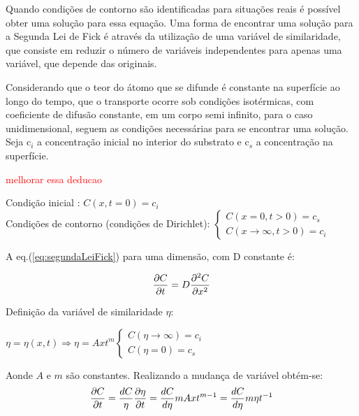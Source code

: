 \documentclass[]{politex}
\newcommand\myworries[1]{\textcolor{red}{#1}}
\begin{document}
	Quando condições de contorno são identificadas para situações reais é possível obter uma solução para essa equação. Uma forma de encontrar uma solução para a Segunda Lei de Fick é através da utilização de uma variável de similaridade, que consiste em reduzir o número de variáveis independentes para apenas uma variável, que depende das originais. \par
	Considerando que o teor do átomo que se difunde é constante na superfície ao longo do tempo, que o transporte ocorre sob condições isotérmicas, com coeficiente de difusão constante, em um corpo semi infinito, para o caso unidimensional, seguem as condições necessárias para se encontrar uma solução. Seja c$_i$ a concentração inicial no interior do substrato e c$_s$ a concentração na superfície.\par
\myworries{melhorar essa deducao}
\begin{center} 
	Condição inicial : $C(x,t=0) = c_i$ \\
	Condições de contorno (condições de Dirichlet): 
	\begin{math}
  		\left\{
    	\begin{array}{l}
      		C(x=0,t>0) = c_s\\
      		C(x\rightarrow \infty, t>0) = c_i
    	\end{array}
  		\right.
	\end{math}
\end{center}

A eq.(\ref{eq:segundaLeiFick}) para uma dimensão, com D constante é:

\begin{equation} \label{eq:segundaLeiFickUmD}
 \pdv{C}{t} = D\pdv[2]{C}{x}
\end{equation}

Definição da variável de similaridade $\eta$:

\begin{center}
	\begin{math}
		\eta = \eta(x,t) \Rightarrow \eta = Axt^m
		\left\{
    		\begin{array}{l}
      			C(\eta\rightarrow \infty) = c_i\\
      			C(\eta=0) = c_s
    		\end{array}
		\right.
	\end{math}
\end{center}

Aonde $A$ e $m$ são constantes.
Realizando a mudança de variável obtém-se:
\begin{equation} \label{eq:solA}
 \pdv{C}{t} = \frac{dC}{\eta}\pdv{\eta}{t} = \frac{dC}{d\eta}mAxt^{m-1} = \frac{dC}{d\eta}m\eta t^{-1}
\end{equation}
\end{document}
